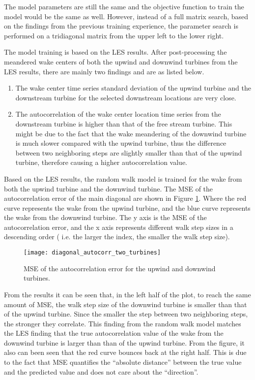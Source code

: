 \documentclass{umthesis}
\begin{document}
The model parameters are still the same and the objective function to train the model would be the same as well. However, instead of a full matrix search, based on the findings from the previous training experience, the parameter search is performed on a tridiagonal matrix from the upper left to the lower right.  
 
The model training is based on the LES results. After post-processing the meandered wake centers of both the upwind and downwind turbines from the LES results, there are mainly two findings and are as listed below.

\begin{enumerate}
  \item The wake center time series standard deviation of the upwind turbine and the downstream turbine for the selected downstream locations are very close.
  \item The autocorrelation of the wake center location time series from the downstream turbine is higher than that of the free stream turbine. This might be due to the fact that the wake meandering of the downwind turbine is much slower compared with the upwind turbine, thus the difference between two neighboring steps are slightly smaller than that of the upwind turbine, therefore causing a higher autocorrelation value.
\end{enumerate}

Based on the LES results, the random walk model is trained for the wake from both the upwind turbine and the downwind turbine. The MSE of the autocorrelation error of the main diagonal are shown in Figure \ref{fig:diag_corr}. Where the red curve represents the wake from the upwind turbine, and the blue curve represents the wake from the downwind turbine. The y axis is the MSE of the autocorrelation error, and the x axis represents different walk step sizes in a descending order ( i.e. the larger the index, the smaller the walk step size).

\begin{figure}
  \centering
  \texttt{[image: diagonal\_autocorr\_two\_turbines]}
  \caption{MSE of the autocorrelation error for the upwind and downwind turbines.}\label{fig:diag_corr}
\end{figure}

From the results it can be seen that, in the left half of the plot, to reach the same amount of MSE, the walk step size of the downwind turbine is smaller than that of the upwind turbine. Since the smaller the step between two neighboring steps, the stronger they correlate. This finding from the random walk model matches the LES finding that the true autocorrelation value of the wake from the downwind turbine is larger than than of the upwind turbine. From the figure, it also can been seen that the red curve bounces back at the right half. This is due to the fact that MSE quantifies the ``absolute distance'' between the true value and the predicted value and does not care about the ``direction''.  
\end{document}
